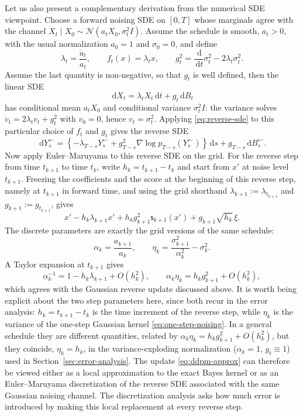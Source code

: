 \documentclass{amsart}
\numberwithin{equation}{section}
\theoremstyle{plain}
\theoremstyle{definition}
\theoremstyle{remark}
\newcommand{\dd}{\,\mathrm{d}}
\newcommand{\Id}{I}
\newcommand{\score}{\mathsf{s}}
\newcommand{\normal}[2]{\mathcal{N}\!\left(#1,#2\right)}
\begin{document}
Let us also present a complementary derivation from the numerical SDE viewpoint. Choose a
forward noising SDE on $[0,T]$ whose marginals agree with the channel
$X_t\mid X_0\sim\normal{a_tX_0}{\sigma_t^2\Id}$.  Assume the schedule is smooth,
$a_t>0$, with the usual normalization $a_0=1$ and $\sigma_0=0$, and define
\[
    \lambda_t=\frac{\dot a_t}{a_t},
    \qquad
    f_t(x)=\lambda_t x,
    \qquad
    g_t^2=\frac{\dd}{\dd t}\sigma_t^2-2\lambda_t\sigma_t^2.
\]
Assume the last quantity is non-negative, so that $g_t$ is well defined, then the linear SDE
\[
    \dd X_t=\lambda_tX_t\dd t+g_t\dd B_t
\]
has conditional mean $a_tX_0$ and conditional variance $\sigma_t^2\Id$:
the variance solves $\dot v_t=2\lambda_tv_t+g_t^2$ with $v_0=0$, hence
$v_t=\sigma_t^2$.  Applying \eqref{eq:reverse-sde} to this particular choice of
$f_t$ and $g_t$ gives the reverse SDE
\[
    \dd Y^{\leftarrow}_s
    =
    \left\{
    -\lambda_{T-s}Y^{\leftarrow}_s
    +
    g_{T-s}^2\nabla\log p_{T-s}(Y^{\leftarrow}_s)
    \right\}\dd s
    +
    g_{T-s}\dd B^{\leftarrow}_s.
\]
Now apply Euler--Maruyama to this reverse SDE on the grid.  For the
reverse step from time $t_{k+1}$ to time $t_k$, write
$h_k=t_{k+1}-t_k$ and start from $x'$ at noise level $t_{k+1}$.  Freezing the
coefficients and the score at the beginning of this reverse step, namely at
$t_{k+1}$ in forward time, and using the grid shorthand
$\lambda_{k+1}:=\lambda_{t_{k+1}}$ and $g_{k+1}:=g_{t_{k+1}}$, gives
\[
    x'
    -h_k\lambda_{k+1}x'
    +h_kg_{k+1}^2\score_{k+1}(x')
    +g_{k+1}\sqrt{h_k}\,\xi.
\]
The discrete parameters are exactly the grid versions of the same schedule:
\[
    \alpha_k=\frac{a_{k+1}}{a_k},
    \qquad
    \eta_k=\frac{\sigma_{k+1}^2}{\alpha_k^2}-\sigma_k^2.
\]
A Taylor expansion at $t_{k+1}$ gives
\[
    \alpha_k^{-1}
    =
    1-h_k\lambda_{k+1}+O(h_k^2),
    \qquad
    \alpha_k\eta_k
    =
    h_kg_{k+1}^2+O(h_k^2),
\]
which agrees with the Gaussian reverse update discussed above.
It is worth being explicit about the two step parameters here, since both recur
in the error analysis: $h_k=t_{k+1}-t_k$ is the time increment of the reverse
step, while $\eta_k$ is the variance of the one-step Gaussian kernel
\eqref{eq:one-step-noising}.  In a general schedule they are different
quantities, related by $\alpha_k\eta_k=h_kg_{k+1}^2+O(h_k^2)$, but they coincide,
$\eta_k=h_k$, in the variance-exploding normalization ($\alpha_k=1$,
$g_t\equiv1$) used in Section~\ref{sec:error-analysis}.
The update \eqref{eq:ddpm-approx} can therefore be viewed either as
a local approximation to the exact Bayes kernel or as an Euler--Maruyama
discretization of the reverse SDE associated with the same Gaussian noising
channel.  The discretization analysis asks how much error is introduced by
making this local replacement at every reverse step.
\end{document}
